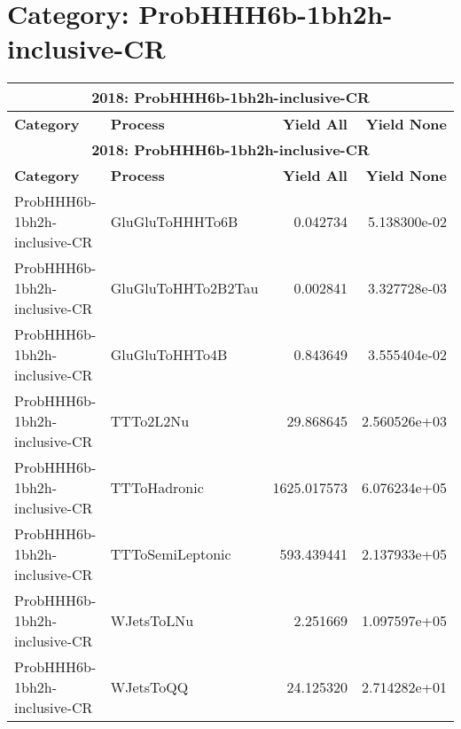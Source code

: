 \documentclass{article}
\begin{document}
\section*{Category: ProbHHH6b-1bh2h-inclusive-CR}
\begin{longtable}[c]{|l|l|r|r|}
\hline
\multicolumn{4}{|c|}{\textbf{2018: ProbHHH6b-1bh2h-inclusive-CR}} \\
\hline
\textbf{Category} & \textbf{Process} & \textbf{Yield All} & \textbf{Yield None} \\
\hline
\endfirsthead
\hline
\multicolumn{4}{|c|}{\textbf{2018: ProbHHH6b-1bh2h-inclusive-CR}} \\
\hline
\textbf{Category} & \textbf{Process} & \textbf{Yield All} & \textbf{Yield None} \\
\hline
\endhead
ProbHHH6b-1bh2h-inclusive-CR & GluGluToHHHTo6B & 0.042734 & 5.138300e-02 \\
\hline
ProbHHH6b-1bh2h-inclusive-CR & GluGluToHHTo2B2Tau & 0.002841 & 3.327728e-03 \\
\hline
ProbHHH6b-1bh2h-inclusive-CR & GluGluToHHTo4B & 0.843649 & 3.555404e-02 \\
\hline
ProbHHH6b-1bh2h-inclusive-CR & TTTo2L2Nu & 29.868645 & 2.560526e+03 \\
\hline
ProbHHH6b-1bh2h-inclusive-CR & TTToHadronic & 1625.017573 & 6.076234e+05 \\
\hline
ProbHHH6b-1bh2h-inclusive-CR & TTToSemiLeptonic & 593.439441 & 2.137933e+05 \\
\hline
ProbHHH6b-1bh2h-inclusive-CR & WJetsToLNu & 2.251669 & 1.097597e+05 \\
\hline
ProbHHH6b-1bh2h-inclusive-CR & WJetsToQQ & 24.125320 & 2.714282e+01 \\
\hline
\end{longtable}
\end{document}
